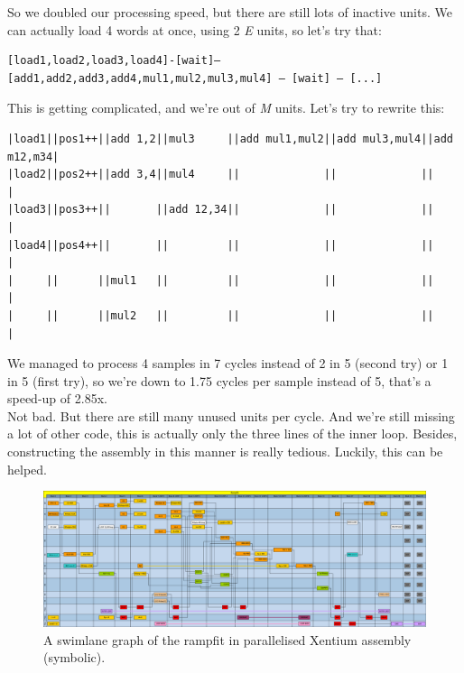 \noindent
So we doubled our processing speed, but there are still lots of inactive units.
We can actually load 4 words at once, using 2 \emph{E} units, so let's try that:

\begin{lstlisting}
[load1,load2,load3,load4]-[wait]–[add1,add2,add3,add4,mul1,mul2,mul3,mul4] – [wait] – [...]
\end{lstlisting}


\noindent
This is getting complicated, and we're out of \emph{M} units.
Let's try to rewrite this:




\begin{lstlisting}
|load1||pos1++||add 1,2||mul3     ||add mul1,mul2||add mul3,mul4||add m12,m34|
|load2||pos2++||add 3,4||mul4     ||             ||             ||           |
|load3||pos3++||       ||add 12,34||             ||             ||           |
|load4||pos4++||       ||         ||             ||             ||           |
|     ||      ||mul1   ||         ||             ||             ||           |
|     ||      ||mul2   ||         ||             ||             ||           |
\end{lstlisting}

\noindent
We managed to process 4 samples in 7 cycles instead of 2 in 5 (second try) or 1
in 5 (first try), so we're down to 1.75 cycles per sample instead of 5, that's
a speed-up of \approx 2.85x. \\

\noindent
Not bad. But there are still many unused units per cycle. And we're still
missing a lot of other code, this is actually only the three lines of the inner
loop. Besides, constructing the assembly in this manner is really tedious.
Luckily, this can be helped. \\

\begin{figure}
\begin{center}
	\includegraphics[width=1.0\columnwidth]{images/rampfit_xen}
	\caption{A swimlane graph of the rampfit in parallelised Xentium
		assembly (symbolic).}
	\label{fig:xenramp}
\end{center}
\end{figure}

